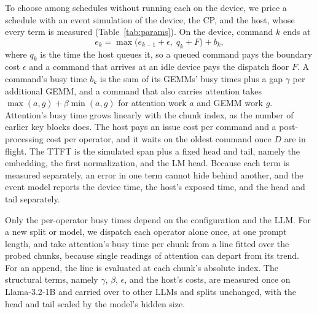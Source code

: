 To choose among schedules without running each on the device, we price a schedule with an event simulation of the device, the CP, and the host, whose every term is measured (Table~\ref{tab:params}).
On the device, command $k$ ends at
\begin{equation}
\label{eq:cmd}
e_k = \max\bigl(e_{k-1} + \epsilon,\; q_k + F\bigr) + b_k,
\end{equation}
where $q_k$ is the time the host queues it, so a queued command pays the boundary cost $\epsilon$ and a command that arrives at an idle device pays the dispatch floor $F$.
A command's busy time $b_k$ is the sum of its GEMMs' busy times plus a gap $\gamma$ per additional GEMM, and a command that also carries attention takes $\max(a, g) + \beta \min(a, g)$ for attention work $a$ and GEMM work $g$.
Attention's busy time grows linearly with the chunk index, as the number of earlier key blocks does.
The host pays an issue cost per command and a post-processing cost per operator, and it waits on the oldest command once $D$ are in flight.
The TTFT is the simulated span plus a fixed head and tail, namely the embedding, the first normalization, and the LM head.
Because each term is measured separately, an error in one term cannot hide behind another, and the event model reports the device time, the host's exposed time, and the head and tail separately.

Only the per-operator busy times depend on the configuration and the LLM.
For a new split or model, we dispatch each operator alone once, at one prompt length, and take attention's busy time per chunk from a line fitted over the probed chunks, because single readings of attention can depart from its trend.
For an append, the line is evaluated at each chunk's absolute index.
The structural terms, namely $\gamma$, $\beta$, $\epsilon$, and the host's costs, are measured once on Llama-3.2-1B and carried over to other LLMs and splits unchanged, with the head and tail scaled by the model's hidden size.

